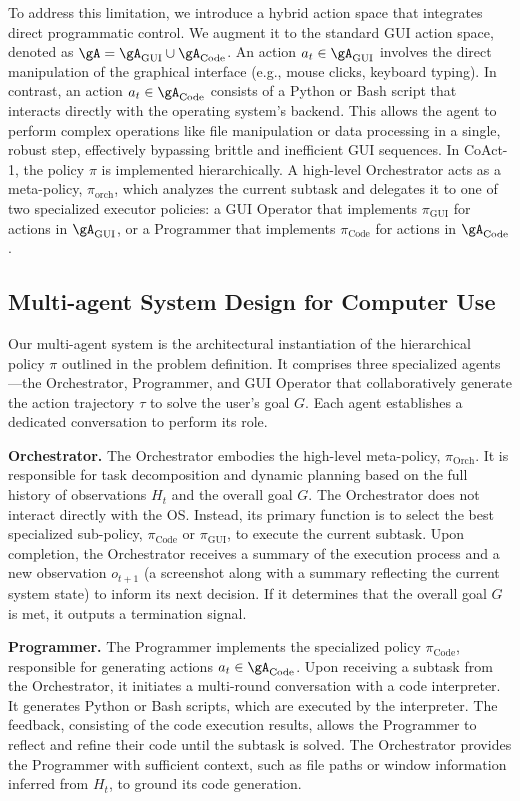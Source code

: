 \documentclass{article} %
\newcommand{\ours}{CoAct-1\xspace}
\begin{document}
To address this limitation, we introduce a hybrid action space that integrates direct programmatic control. We augment it to the standard GUI action space, denoted as $\gA = \gA_{\text{GUI}}\cup \gA_{\text{Code}}$. An action $a_t\in\gA_{\text{GUI}}$ involves the direct manipulation of the graphical interface (e.g., mouse clicks, keyboard typing). In contrast, an action $a_t\in \gA_{\text{Code}}$ consists of a Python or Bash script that interacts directly with the operating system's backend. This allows the agent to perform complex operations like file manipulation or data processing in a single, robust step, effectively bypassing brittle and inefficient GUI sequences. In \ours, the policy $\pi$ is implemented hierarchically. A high-level Orchestrator acts as a meta-policy, $\pi_{\text{orch}}$, which analyzes the current subtask and delegates it to one of two specialized executor policies: a GUI Operator that implements $\pi_{\text{GUI}}$ for actions in $\gA_{\text{GUI}}$, or a Programmer that implements $\pi_{\text{Code}}$ for actions in $\gA_{\text{Code}}$.

\subsection{Multi-agent System Design for Computer Use}
Our multi-agent system is the architectural instantiation of the hierarchical policy $\pi$ outlined in the problem definition. It comprises three specialized agents—the Orchestrator, Programmer, and GUI Operator that collaboratively generate the action trajectory $\tau$ to solve the user's goal $G$. Each agent establishes a dedicated conversation to perform its role.

\noindent\textbf{Orchestrator.} The Orchestrator embodies the high-level meta-policy, $\pi_{\text{Orch}}$. It is responsible for task decomposition and dynamic planning based on the full history of observations $H_t$ and the overall goal $G$. The Orchestrator does not interact directly with the OS. Instead, its primary function is to select the best specialized sub-policy, $\pi_{\text{Code}}$ or $\pi_{\text{GUI}}$, to execute the current subtask. Upon completion, the Orchestrator receives a summary of the execution process and a new observation $o_{t+1}$ (a screenshot along with a summary reflecting the current system state) to inform its next decision. If it determines that the overall goal $G$ is met, it outputs a termination signal.

\noindent\textbf{Programmer.} The Programmer implements the specialized policy $\pi_{\text{Code}}$, responsible for generating actions $a_t\in\gA_{\text{Code}}$. Upon receiving a subtask from the Orchestrator, it initiates a multi-round conversation with a code interpreter. It generates Python or Bash scripts, which are executed by the interpreter. The feedback, consisting of the code execution results, allows the Programmer to reflect and refine their code until the subtask is solved. The Orchestrator provides the Programmer with sufficient context, such as file paths or window information inferred from $H_t$, to ground its code generation.
\end{document}
